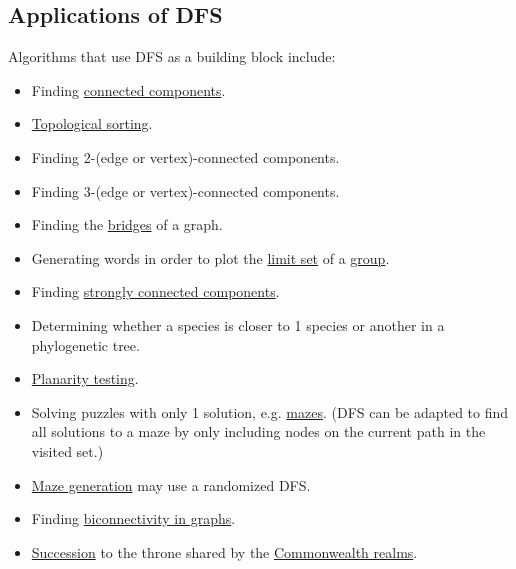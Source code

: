 \documentclass[oneside]{book}
\begin{document}
\subsection{Applications of DFS}
Algorithms that use DFS as a building block include:
\begin{itemize}
	\item Finding \href{https://en.wikipedia.org/wiki/Connected_component_(graph_theory)}{connected components}.
	\item \href{https://en.wikipedia.org/wiki/Topological_sorting}{Topological sorting}.
	\item Finding 2-(edge or vertex)-connected components.
	\item Finding 3-(edge or vertex)-connected components.
	\item Finding the \href{https://en.wikipedia.org/wiki/Bridge_(graph_theory)#Bridge-finding_algorithm}{bridges} of a graph.
	\item Generating words in order to plot the \href{https://en.wikipedia.org/wiki/Limit_set}{limit set} of a \href{https://en.wikipedia.org/wiki/Group_(mathematics)}{group}.
	\item Finding \href{https://en.wikipedia.org/wiki/Strongly_connected_components}{strongly connected components}.
	\item Determining whether a species is closer to 1 species or another in a phylogenetic tree.
	\item \href{https://en.wikipedia.org/wiki/Planarity_testing}{Planarity testing}.
	\item Solving puzzles with only 1 solution, e.g. \href{https://en.wikipedia.org/wiki/Maze}{mazes}. (DFS can be adapted to find all solutions to a maze by only including nodes on the current path in the visited set.)
	\item \href{https://en.wikipedia.org/wiki/Maze_generation}{Maze generation} may use a randomized DFS.
	\item Finding \href{https://en.wikipedia.org/wiki/Biconnected_graph}{biconnectivity in graphs}.
	\item \href{https://en.wikipedia.org/wiki/Primogeniture#Absolute_primogeniture}{Succession} to the throne shared by the \href{https://en.wikipedia.org/wiki/Commonwealth_realms}{Commonwealth realms}.
\end{itemize}

\end{document}

